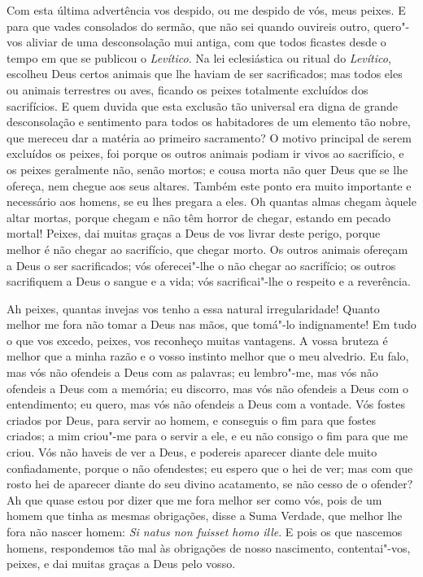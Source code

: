 Com esta última advertência vos despido, ou me despido de vós, meus
peixes. E para que vades consolados do sermão, que não sei quando
ouvireis outro, quero"-vos aliviar de uma desconsolação mui antiga, com
que todos ficastes desde o tempo em que se publicou o \emph{Levítico}.
Na lei eclesiástica ou ritual do \emph{Levítico}, escolheu Deus certos
animais que lhe haviam de ser sacrificados; mas todos eles ou animais
terrestres ou aves, ficando os peixes totalmente excluídos dos
sacrifícios. E quem duvida que esta exclusão tão universal era digna de
grande desconsolação e sentimento para todos os habitadores de um
elemento tão nobre, que mereceu dar a matéria ao primeiro sacramento? O
motivo principal de serem excluídos os peixes, foi porque os outros
animais podiam ir vivos ao sacrifício, e os peixes geralmente não, senão
mortos; e cousa morta não quer Deus que se lhe ofereça, nem chegue aos
seus altares. Também este ponto era muito importante e necessário aos
homens, se eu lhes pregara a eles. Oh quantas almas chegam àquele altar
mortas, porque chegam e não têm horror de chegar, estando em pecado
mortal! Peixes, dai muitas graças a Deus de vos livrar deste perigo,
porque melhor é não chegar ao sacrifício, que chegar morto. Os outros
animais ofereçam a Deus o ser sacrificados; vós oferecei"-lhe o não
chegar ao sacrifício; os outros sacrifiquem a Deus o sangue e a vida;
vós sacrificai"-lhe o respeito e a reverência.

Ah peixes, quantas invejas vos tenho a essa natural irregularidade!
Quanto melhor me fora não tomar a Deus nas mãos, que tomá"-lo
indignamente! Em tudo o que vos excedo, peixes, vos reconheço muitas
vantagens. A vossa bruteza é melhor que a minha razão e o vosso instinto
melhor que o meu alvedrio. Eu falo, mas vós não ofendeis a Deus com as
palavras; eu lembro"-me, mas vós não ofendeis a Deus com a memória; eu
discorro, mas vós não ofendeis a Deus com o entendimento; eu quero, mas
vós não ofendeis a Deus com a vontade. Vós fostes criados por Deus, para
servir ao homem, e conseguis o fim para que fostes criados; a mim
criou"-me para o servir a ele, e eu não consigo o fim para que me criou.
Vós não haveis de ver a Deus, e podereis aparecer diante dele muito
confiadamente, porque o não ofendestes; eu espero que o hei de ver; mas
com que rosto hei de aparecer diante do seu divino acatamento, se não
cesso de o ofender? Ah que quase estou por dizer que me fora melhor ser
como vós, pois de um homem que tinha as mesmas obrigações, disse a Suma
Verdade, que melhor lhe fora não nascer homem: \emph{Si natus non
fuisset homo ille}. E pois os que nascemos homens, respondemos tão mal
às obrigações de nosso nascimento, contentai"-vos, peixes, e dai muitas
graças a Deus pelo vosso.

